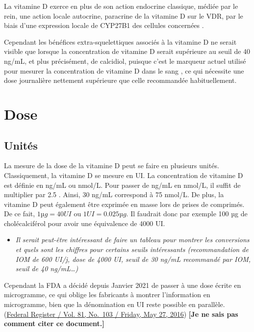 \documentclass[
  a4paper,
  DIV=11,
  numbers=noendperiod,
  listof=totoc]{scrreprt}
\providecommand{\tightlist}{%
  \setlength{\itemsep}{0pt}\setlength{\parskip}{0pt}}\usepackage{longtable,booktabs,array}
\begin{document}
La vitamine D exerce en plus de son action endocrine classique, médiée
par le rein, une action locale autocrine, paracrine de la vitamine D sur
le VDR, par le biais d'une expression locale de CYP27B1 des cellules
concernées \autocite{Carmeliet.2015,Cannell.2008}.

Cependant les bénéfices extra-squelettiques associés à la vitamine D ne
serait visible que lorsque la concentration de vitamine D serait
supérieure au seuil de 40 ng/mL, et plus précisément, de calcidiol,
puisque c'est le marqueur actuel utilisé pour mesurer la concentration
de vitamine D dans le sang \autocite{Caprio.2017}, ce qui nécessite une
dose journalière nettement supérieure que celle recommandée
habituellement.

\hypertarget{dose}{%
\section{Dose}\label{dose}}

\hypertarget{unituxe9s}{%
\subsection{Unités}\label{unituxe9s}}

La mesure de la dose de la vitamine D peut se faire en plusieurs unités.
Classiquement, la vitamine D se mesure en \ac{UI}. La concentration de
vitamine D est définie en ng/mL ou nmol/L. Pour passer de ng/mL en
nmol/L, il suffit de multiplier par 2.5 \autocite{Pramyothin.2012}.
Ainsi, 30 ng/mL correspond à 75 nmol/L. De plus, la vitamine D peut
également être exprimée en masse lors de prises de comprimés. De ce
fait, \(1 µg = 40 UI\) ou \(1 UI = 0.025 µg\). Il faudrait donc par
exemple 100 µg de cholécalciférol pour avoir une équivalence de 4000 UI.

\begin{itemize}
\tightlist
\item
  \emph{Il serait peut-être intéressant de faire un tableau pour montrer
  les conversions et quels sont les chiffres pour certains seuils
  intéressants (recommandation de IOM de 600 UI/j, dose de 4000 UI,
  seuil de 30 ng/mL recommandé par IOM, seuil de 40 ng/mL\ldots)}
\end{itemize}

Cependant la \ac{FDA} a décidé depuis Janvier 2021 de passer à une dose
écrite en microgramme, ce qui oblige les fabricants à montrer
l'information en microgramme, bien que la dénomination en UI reste
possible en parallèle.
(\href{https://www.govinfo.gov/content/pkg/FR-2016-05-27/pdf/2016-11867.pdf}{Federal
Register / Vol. 81, No.~103 / Friday, May 27, 2016}) \textbf{{[}Je ne
sais pas comment citer ce document.{]}}
\end{document}
